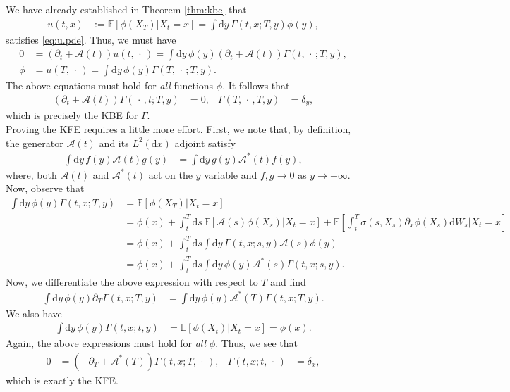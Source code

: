 \documentclass[12pt]{book}
\let\varphi\phi
\numberwithin{equation}{chapter}
\theoremstyle{plain}
\numberwithin{theorem}{section}
\theoremstyle{definition}
\numberwithin{exercise}{chapter}
\let\oldendproof\endproof
\renewenvironment{proof}[1][\proofname]{%
  \oldproof[\scshape\underline{#1}]%
}{\oldendproof}
\newcommand{\<}{\langle}
\renewcommand{\>}{\rangle}
\renewcommand{\(}{\left(}
\renewcommand{\)}{\right)}
\renewcommand{\[}{\left[}
\renewcommand{\]}{\right]}
\newcommand\Eb{\mathds{E}}
\newcommand\Ac{\mathscr{A}}
\newcommand\sig{\sigma}
\newcommand\Gam{\Gamma}
\newcommand\del{\delta}
\renewcommand\d{\partial}
\newcommand\dd{\mathrm{d}}
\begin{document}
\begin{proof}
We have already established in Theorem \ref{thm:kbe} that
\begin{align}
u(t,x)
	&:=	\Eb[ \varphi(X_T) | X_t = x ]
	=		\int \dd y \, \Gam(t,x;T,y) \varphi(y) ,
\end{align}
satisfies \eqref{eq:u.pde}.  Thus, we must have
\begin{align}
0
	&=	(\d_t + \Ac(t)) u(t,\,\cdot \,)
	=		\int \dd y \, \varphi(y) (\d_t + \Ac(t)) \Gam(t,\, \cdot \,;T,y)  , \label{eq:must.have.pde} \\
\varphi
	&=	u(T,\,\cdot \,) = \int \dd y \, \varphi(y) \Gam(T,\, \cdot \,;T,y) . \label{eq:must.have.bc}
\end{align}
The above equations must hold for \emph{all} functions $\varphi$.  It follows that
\begin{align}
(\d_t + \Ac(t) ) \Gam(\, \cdot \,,t;T,y)
	&=	0 , &
\Gam(T,\, \cdot \,,T,y)
	&=	\del_y ,
\end{align}
which is precisely the KBE for $\Gam$.
\\[0.5em]
Proving the KFE requires a little more effort.  First, we note that, by definition, the generator $\Ac(t)$ and its $L^2(\dd x)$ adjoint satisfy
\begin{align}
\int \dd y \, f(y) \Ac(t) g(y)
	&=	\int \dd y \, g(y) \Ac^*(t) f(y) ,
\end{align}
where, both $\Ac(t)$ and $\Ac^*(t)$ act on the $y$ variable and $f,g \to 0$ as $y \to \pm \infty$.  Now, observe that
\begin{align}
\int \dd y \, \varphi(y) \Gam(t,x;T,y)
	&=	\Eb[ \varphi(X_T) | X_t = x ] \\
	&=	\varphi(x) + \int_t^T \dd s \, \Eb[ \Ac(s) \varphi(X_s) | X_t = x ] + \Eb[ \int_t^T \sig(s,X_s) \d_x \varphi(X_s) \dd W_s | X_t = x ] \\
	&=	\varphi(x) + \int_t^T \dd s \int \dd y \, \Gam(t,x;s,y) \Ac(s) \varphi(y) \\
	&=	\varphi(x) + \int_t^T \dd s \int \dd y \, \varphi(y) \Ac^*(s) \Gam(t,x;s,y) . 
\end{align}
Now, we differentiate the above expression with respect to $T$ and find
\begin{align}
\int \dd y \, \varphi(y) \d_T \Gam(t,x;T,y)
	&=	\int \dd y \, \varphi(y) \Ac^*(T) \Gam(t,x;T,y) .
\end{align}
We also have
\begin{align}
\int \dd y \, \varphi(y) \Gam(t,x;t,y)
	&=	\Eb[ \varphi(X_t) | X_t = x ] = \varphi(x) .
\end{align}
Again, the above expressions must hold for \emph{all} $\varphi$.  Thus, we see that
\begin{align}
0
	&= (-\d_T + \Ac^*(T) ) \Gam(t,x;T,\,\cdot \,) , &
\Gam(t,x;t,\,\cdot \,)
	&=	\del_x ,
\end{align}
which is exactly the KFE.
\end{proof}
\end{document}
